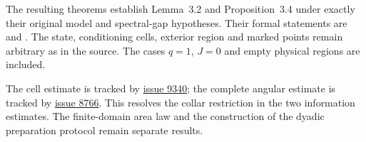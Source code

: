 \documentclass{article}
\begin{document}
The resulting theorems establish Lemma~3.2 and Proposition~3.4 under
exactly their original model and spectral-gap hypotheses. Their formal
statements are
and .
The state, conditioning cells, exterior region and marked points remain
arbitrary as in the source. The cases $q=1$, $J=0$ and empty physical
regions are included.

The cell estimate is tracked by
\href{https://github.com/LionSR/TNLean/issues/9340}{issue 9340};
the complete angular estimate is tracked by
\href{https://github.com/LionSR/TNLean/issues/8766}{issue 8766}.
This resolves the collar restriction in the two information estimates.
The finite-domain area law and the construction of the dyadic preparation
protocol remain separate results.



\end{document}
